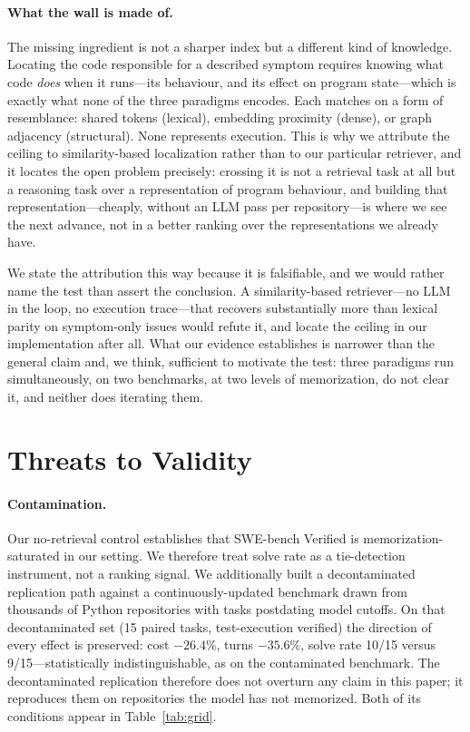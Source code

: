 \documentclass[11pt,letterpaper]{article}
\begin{document}
\paragraph{What the wall is made of.}
The missing ingredient is not a sharper index but a different kind of knowledge.
Locating the code responsible for a described symptom requires knowing what code
\emph{does} when it runs---its behaviour, and its effect on program state---which
is exactly what none of the three paradigms encodes. Each matches on a form of
resemblance: shared tokens (lexical), embedding proximity (dense), or graph
adjacency (structural). None represents execution. This is why we attribute the
ceiling to similarity-based localization rather than to our particular retriever,
and it locates the open problem precisely: crossing it is not a
retrieval task at all but a reasoning task over a representation of program
behaviour, and building that representation---cheaply, without an LLM pass per
repository---is where we see the next advance, not in a better ranking over the
representations we already have.

We state the attribution this way because it is falsifiable, and we would rather
name the test than assert the conclusion. A similarity-based retriever---no LLM in
the loop, no execution trace---that recovers substantially more than lexical parity
on symptom-only issues would refute it, and locate the ceiling in our
implementation after all. What our evidence establishes is narrower than the
general claim and, we think, sufficient to motivate the test: three paradigms run
simultaneously, on two benchmarks, at two levels of memorization, do not clear it,
and neither does iterating them.

\section{Threats to Validity}
\label{sec:threats}

\paragraph{Contamination.}
Our no-retrieval control establishes that SWE-bench Verified is
memorization-saturated in our setting. We therefore treat solve rate as a
tie-detection instrument, not a ranking signal. We additionally built a
decontaminated replication path against a continuously-updated benchmark drawn
from thousands of Python repositories with tasks postdating model cutoffs. On
that decontaminated set (15 paired tasks, test-execution verified) the direction
of every effect is preserved: cost $-26.4\%$, turns $-35.6\%$, solve rate
10/15 versus 9/15---statistically indistinguishable, as on the contaminated
benchmark. The decontaminated replication therefore does not overturn any claim
in this paper; it reproduces them on repositories the model has not memorized.
Both of its conditions appear in Table~\ref{tab:grid}.
\end{document}
